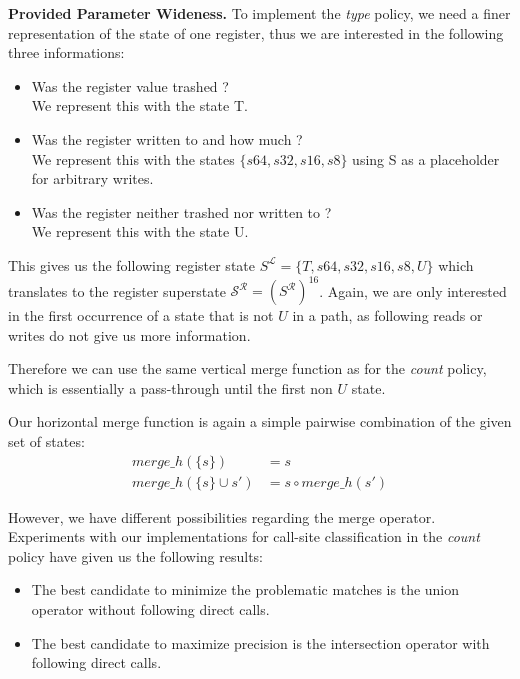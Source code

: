 \textbf{Provided Parameter Wideness.}
\label{subsection:providedparamwideness}
To implement the \emph{type} policy, we need a finer representation of the state of one register, thus we are interested in the following three informations:

\begin{itemize}
\item Was the register value trashed ? \\ We represent this with the state T.
\item Was the register written to and how much ? \\ We represent this with the states $\{ s64, s32, s16, s8 \}$ using S as a placeholder for arbitrary writes.
\item Was the register neither trashed nor written to ? \\ We represent this with the state U.
\end{itemize}
This gives us the following register state $S^\mathcal{L} = \{ T, s64, s32, s16, s8, U \}$ which translates to the register superstate $\mathcal{S}^\mathcal{R} = (S^\mathcal{R})^{16}$.
Again, we are only interested in the first occurrence of a state that is not $U$ in a path, as following reads or writes do not give us more information.

Therefore we can use the same vertical merge function as for the \emph{count} policy, which is essentially a pass-through until the first non $U$ state.

Our horizontal merge function is again a simple pairwise combination of the given set of states:
\begin{align}
merge\_h(\{s\}) &= s\\
merge\_h(\{s\} \cup s') &= s \circ merge\_h(s')
\end{align}

However, we have different possibilities regarding the merge operator. Experiments with our implementations for call-site 
classification in the \emph{count} policy have given us the following results:
\begin{itemize}
\item The best candidate to minimize the problematic matches is the union operator without following direct calls.
\item The best candidate to maximize precision is the intersection operator with following direct calls.
\end{itemize}

